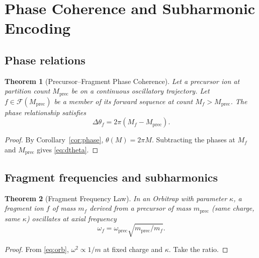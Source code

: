 \documentclass[twocolumn,10pt,a4paper]{article}
\theoremstyle{thmstyle}
\newtheorem{theorem}{Theorem}[section]
\theoremstyle{definition}
\theoremstyle{remark}
\newcommand{\calF}{\mathcal{F}}
\begin{document}
\section{Phase Coherence and Subharmonic Encoding}
\label{sec:phase}

\subsection{Phase relations}

\begin{theorem}[Precursor--Fragment Phase Coherence]
\label{thm:coh}
Let a precursor ion at partition count $M_{\mathrm{prec}}$ be on a
continuous oscillatory trajectory. Let $f\in\calF(M_{\mathrm{prec}})$
be a member of its forward sequence at count
$M_{f}>M_{\mathrm{prec}}$. The phase relationship satisfies
\begin{equation}
\boxed{\;\Delta\theta_{f}=2\pi(M_{f}-M_{\mathrm{prec}}).\;}
\label{eq:dtheta}
\end{equation}
\end{theorem}

\begin{proof}
By Corollary~\ref{cor:phase}, $\theta(M)=2\pi M$. Subtracting the
phases at $M_{f}$ and $M_{\mathrm{prec}}$ gives \eqref{eq:dtheta}.
\end{proof}

\subsection{Fragment frequencies and subharmonics}

\begin{theorem}[Fragment Frequency Law]
\label{thm:ffreq}
In an Orbitrap with parameter $\kappa$, a fragment ion $f$ of mass
$m_{f}$ derived from a precursor of mass $m_{\mathrm{prec}}$ (same
charge, same $\kappa$) oscillates at axial frequency
\begin{equation}
\omega_{f}=\omega_{\mathrm{prec}}\sqrt{m_{\mathrm{prec}}/m_{f}}.
\label{eq:ffreq}
\end{equation}
\end{theorem}

\begin{proof}
From \eqref{eq:orb}, $\omega^{2}\propto 1/m$ at fixed charge and
$\kappa$. Take the ratio.
\end{proof}
\end{document}
